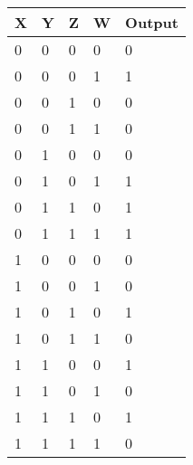 \begin{enumerate}
    \begin{table}[H]
    \centering
    \begin{tabular}{|l|l|l|l|l|}
    \hline
    X & Y & Z & W & Output \\ \hline
    0 & 0 & 0 & 0 & 0      \\ \hline
    0 & 0 & 0 & 1 & 1      \\ \hline
    0 & 0 & 1 & 0 & 0      \\ \hline
    0 & 0 & 1 & 1 & 0      \\ \hline
    0 & 1 & 0 & 0 & 0      \\ \hline
    0 & 1 & 0 & 1 & 1      \\ \hline
    0 & 1 & 1 & 0 & 1      \\ \hline
    0 & 1 & 1 & 1 & 1      \\ \hline
    1 & 0 & 0 & 0 & 0      \\ \hline
    1 & 0 & 0 & 1 & 0      \\ \hline
    1 & 0 & 1 & 0 & 1      \\ \hline
    1 & 0 & 1 & 1 & 0      \\ \hline
    1 & 1 & 0 & 0 & 1      \\ \hline
    1 & 1 & 0 & 1 & 0      \\ \hline
    1 & 1 & 1 & 0 & 1      \\ \hline
    1 & 1 & 1 & 1 & 0      \\ \hline
    \end{tabular}
    \end{table}

    
\end{enumerate}